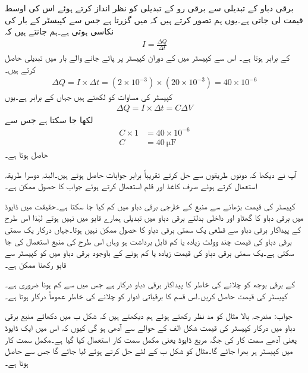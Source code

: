 برقی دباو کے تبدیلی سے برقی رو کے تبدیلی کو نظر انداز کرتے ہوئے اس کی اوسط قیمت لی جاتی ہے۔یوں ہم تصور کرتے ہیں کہ  میں  گزرتا ہے جس سے کپیسٹر کے بار کی نکاسی ہوتی ہے۔ہم جانتے ہیں کہ
\begin{align*}
I=\frac{\Delta Q}{\Delta t}
\end{align*}
کے برابر ہوتا ہے۔ اس سے کپیسٹر میں   کے دوران کپیسٹر پر پائے جانے والے بار میں تبدیلی  حاصل کرتے ہیں۔
\begin{align*}
\Delta Q=I \times \Delta t=\left(2 \times 10^{-3} \right) \times \left(20 \times 10^{-3} \right)=40 \times 10^{-6}
\end{align*}
کپیسٹر کی مساوات  کو  لکھتے ہیں جہاں  کے برابر ہے۔یوں
\begin{align*}
\Delta Q=I \times \Delta t=C \Delta V
\end{align*}
لکھا جا سکتا ہے جس سے
\begin{align*}
C \times 1&=40 \times 10^{-6}\\
C&=\SI{40}{\micro \farad}
\end{align*}
حاصل ہوتا ہے۔

آپ نے دیکھا کہ دونوں طریقوں سے حل کرتے تقریباً برابر جوابات حاصل ہوتے ہیں۔البتہ دوسرا طریقہ استعمال کرتے ہوئے صرف کاغذ اور قلم استعمال کرتے ہوئے جواب کا حصول ممکن ہے۔

کپیسٹر کی قیمت بڑھانے سے منبع کے خارجی برقی دباو میں  کم کیا جا سکتا ہے۔حقیقت میں ڈایوڈ میں برقی دباو کا گھٹاو اور داخلی بدلتے برقی دباو میں تبدیلی ہمارے قابو میں نہیں ہوتے لہٰذا اس طرح کے پیداکار برقی دباو سے قطعی یک سمتی برقی دباو کا حصول ممکن نہیں ہوتا۔جہاں درکار یک سمتی برقی دباو کی  قیمت چند وولٹ زیادہ یا کم  قابل برداشت ہو وہاں اس طرح کی منبع استعمال کی جا سکتی ہے۔یک سمتی برقی دباو کی قیمت زیادہ یا کم ہونے کے باوجود برقی دباو میں  کو کپیسٹر سے قابو رکھنا ممکن ہے۔


 کے برقی بوجھ کو چلانے کی خاطر  کا پیداکار برقی دباو درکار ہے جس میں   سے کم ہونا ضروری ہے۔کپیسٹر کی قیمت حاصل کریں۔اس قسم کا  برقیاتی ادوار کو چلانے کی خاطر عموماً درکار ہوتا ہے۔

جواب: 
مندرجہ بالا مثال کو مد نظر رکھتے ہوئے ہم دیکھتے ہیں کہ شکل  ب میں دکھائے منبع برقی دباو میں درکار کپیسٹر کی قیمت شکل  الف کے حوالے سے آدھی ہو گی کیوں کہ اس میں ایک ڈایوڈ یعنی آدھے سمت کار کی جگہ مربع ڈایوڈ یعنی مکمل سمت کار استعمال کیا گیا ہے۔مکمل سمت کار میں کپیسٹر ہر  بھرا جائے گا۔مثال  کو شکل  ب کے لئے حل کرتے ہوئے  لیا جائے گا جس سے  حاصل ہوتا ہے۔ 
 
